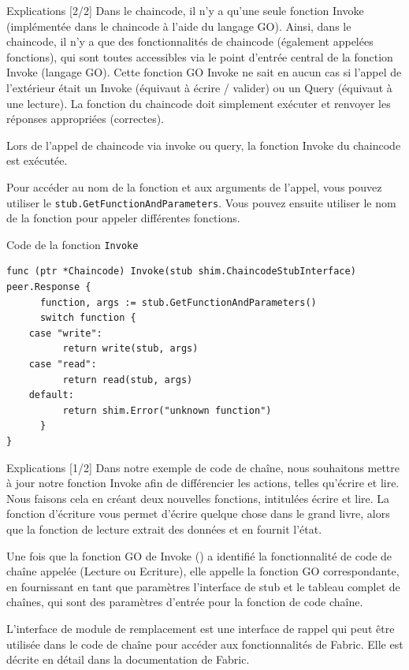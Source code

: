 \documentclass[presentation]{beamer}
\begin{document}
\begin{frame}[fragile,label={sec:orgd311851}]{Explications [2/2]}
 Dans le chaincode, il n'y a qu'une seule fonction Invoke (implémentée dans le chaincode à l'aide du langage GO). 
Ainsi, dans le chaincode, il n'y a que des fonctionnalités de chaincode (également appelées fonctions), qui sont 
toutes accessibles via le point d'entrée central de la fonction Invoke (langage GO). 
Cette fonction GO Invoke ne sait en aucun cas si l'appel de l'extérieur était un Invoke (équivaut à écrire / valider) 
ou un Query (équivaut à une lecture). 
La fonction du chaincode doit simplement exécuter et renvoyer les réponses appropriées (correctes).

Lors de l'appel de chaincode via invoke ou query, la fonction Invoke du chaincode est exécutée. 

Pour accéder au nom de la fonction et aux arguments de l'appel, vous pouvez utiliser le \texttt{stub.GetFunctionAndParameters}. 
Vous pouvez ensuite utiliser le nom de la fonction pour appeler différentes fonctions.
\end{frame}

\begin{frame}[fragile,label={sec:orgc4bce14}]{Code de la fonction \texttt{Invoke}}
 \begin{verbatim}
func (ptr *Chaincode) Invoke(stub shim.ChaincodeStubInterface) peer.Response {
      function, args := stub.GetFunctionAndParameters()
      switch function {
	case "write":
	      return write(stub, args)  
	case "read":
	      return read(stub, args)
	default:
	      return shim.Error("unknown function")
      }
}
\end{verbatim}
\end{frame}
\begin{frame}[label={sec:org692d33c}]{Explications [1/2]}
Dans notre exemple de code de chaîne, nous souhaitons mettre à jour notre fonction Invoke 
afin de différencier les actions, telles qu'écrire et lire. Nous faisons cela en créant 
deux nouvelles fonctions, intitulées écrire et lire. La fonction d'écriture vous permet 
d'écrire quelque chose dans le grand livre, alors que la fonction de lecture extrait des 
données et en fournit l'état.

Une fois que la fonction GO de Invoke () a identifié la fonctionnalité de code de chaîne 
appelée (Lecture ou Ecriture), elle appelle la fonction GO correspondante, en fournissant 
en tant que paramètres l'interface de stub et le tableau complet de chaînes, qui sont des 
paramètres d'entrée pour la fonction de code chaîne.

L'interface de module de remplacement est une interface de rappel qui peut être utilisée 
dans le code de chaîne pour accéder aux fonctionnalités de Fabric. Elle est décrite en 
détail dans la documentation de Fabric.
\end{frame}
\end{document}

